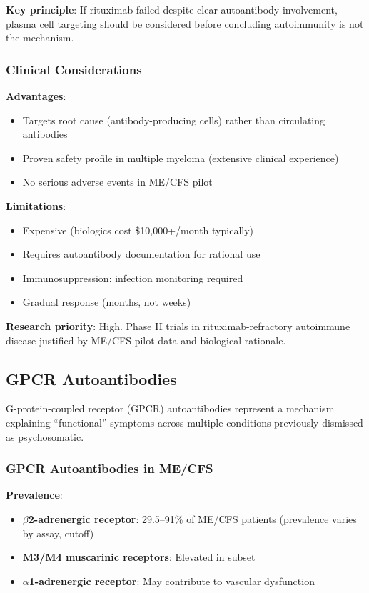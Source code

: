 \textbf{Key principle}: If rituximab failed despite clear autoantibody involvement, plasma cell targeting should be considered before concluding autoimmunity is not the mechanism.

\subsubsection{Clinical Considerations}

\textbf{Advantages}:
\begin{itemize}
    \item Targets root cause (antibody-producing cells) rather than circulating antibodies
    \item Proven safety profile in multiple myeloma (extensive clinical experience)
    \item No serious adverse events in ME/CFS pilot
\end{itemize}

\textbf{Limitations}:
\begin{itemize}
    \item Expensive (biologics cost \$10,000+/month typically)
    \item Requires autoantibody documentation for rational use
    \item Immunosuppression: infection monitoring required
    \item Gradual response (months, not weeks)
\end{itemize}

\textbf{Research priority}: High. Phase II trials in rituximab-refractory autoimmune disease justified by ME/CFS pilot data and biological rationale.

\subsection{GPCR Autoantibodies}
\label{sec:gpcr-translational}

G-protein-coupled receptor (GPCR) autoantibodies represent a mechanism explaining ``functional'' symptoms across multiple conditions previously dismissed as psychosomatic.

\subsubsection{GPCR Autoantibodies in ME/CFS}

\textbf{Prevalence}:
\begin{itemize}
    \item \textbf{$\beta$2-adrenergic receptor}: 29.5--91\% of ME/CFS patients (prevalence varies by assay, cutoff)
    \item \textbf{M3/M4 muscarinic receptors}: Elevated in subset
    \item \textbf{$\alpha$1-adrenergic receptor}: May contribute to vascular dysfunction
\end{itemize}

